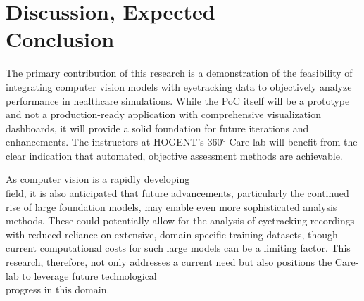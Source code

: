 \documentclass[english]{hogent-article}
\begin{document}
\section{Discussion, Expected\\ Conclusion}
\label{sec:discussion-conclusion}

The primary contribution of this research is a demonstration of the feasibility of 
integrating computer vision models with eyetracking data to objectively analyze performance in healthcare simulations.
While the PoC itself will be a prototype and not a production-ready application with comprehensive visualization dashboards, 
it will provide a solid foundation for future iterations and enhancements.
The instructors at HOGENT's 360° Care-lab will benefit from the clear indication that automated, 
objective assessment methods are achievable.

As computer vision is a rapidly developing\\ field, it is also anticipated that future advancements, 
particularly the continued rise of large foundation models, may enable even more sophisticated analysis methods. 
These could potentially allow for the analysis of eyetracking recordings with reduced reliance on extensive, 
domain-specific training datasets, though current computational costs for such large models can be a limiting factor. 
This research, therefore, not only addresses a current need but also positions the Care-lab to leverage future technological\\ progress in this domain.

\begingroup
\setlength{\emergencystretch}{3em}
\printbibliography[heading=bibintoc]
\endgroup
\end{document}

